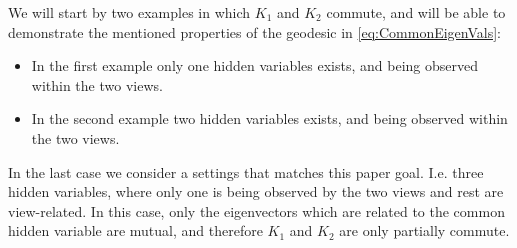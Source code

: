 \documentclass[]{article}
\theoremstyle{definition}
\begin{document}
	We will start by two examples in which $K_1$ and $K_2$ commute, and will be able to demonstrate the mentioned properties of the geodesic in \ref{eq:CommonEigenVals}:
	\begin{itemize}
		\item In the first example  only one hidden variables exists, and being observed within the two views. 
		\item In the second example two hidden variables exists, and being observed within the two views. 
	\end{itemize}
	In the last case we consider a settings that matches this paper goal. I.e. three hidden variables, where only one is being observed by the two views and rest are view-related. In this case, only the eigenvectors which are related to the common hidden variable are mutual, and therefore $K_1$ and $K_2$ are only partially commute.
	
\end{document}
